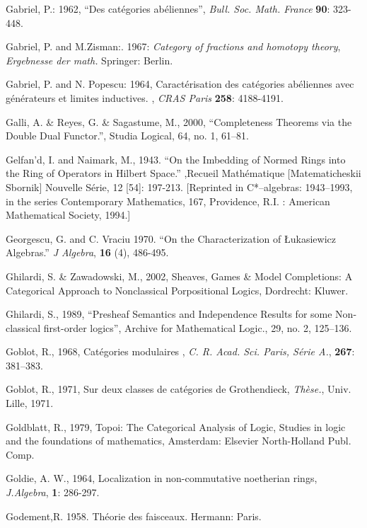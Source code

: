 \documentclass[12pt]{article}
\theoremstyle{plain}
\theoremstyle{definition}
\numberwithin{equation}{section}
\begin{document}
\begin{thebibliography}{99}
Gabriel, P.: 1962, ``Des cat\'egories ab\'eliennes'', \emph{Bull. Soc.
Math. France} \textbf{90}: 323-448.

Gabriel, P. and M.Zisman:. 1967: \emph{Category of fractions and homotopy theory}, \emph{Ergebnesse der math.} Springer: Berlin.

Gabriel, P. and N. Popescu: 1964, Caract\'{e}risation des cat\'egories ab\'eliennes
avec g\'{e}n\'{e}rateurs et limites inductives. , \emph{CRAS Paris} \textbf{258}: 4188-4191.

Galli, A. \& Reyes, G. \& Sagastume, M., 2000, ``Completeness Theorems via the Double Dual Functor.'', Studia Logical, 64, no. 1, 61--81. 

Gelfan'd, I. and Naimark, M., 1943. ``On the Imbedding of Normed Rings into the 
Ring of Operators in Hilbert Space.'' ,Recueil Math\'ematique [Matematicheskii 
Sbornik] Nouvelle S\'erie, 12 [54]: 197-213. [Reprinted in C*--algebras: 
1943--1993, in the series Contemporary Mathematics, 167,  Providence, R.I. : 
American Mathematical Society, 1994.] 

Georgescu, G. and C. Vraciu 1970. ``On the Characterization of \L{}ukasiewicz 
Algebras.'' \emph{J Algebra}, \textbf{16} (4), 486-495.

Ghilardi, S. \& Zawadowski, M., 2002, Sheaves, Games \& Model Completions: A Categorical Approach to Nonclassical Porpositional Logics, Dordrecht: Kluwer.  

Ghilardi, S., 1989, ``Presheaf Semantics and Independence Results for some Non-classical first-order logics'', Archive for Mathematical Logic., 29, no. 2, 125--136. 

Goblot, R., 1968, Cat\'egories modulaires , {\em C. R. Acad. Sci. Paris, S\'erie A.}, \textbf{267}: 381--383.

Goblot, R., 1971, Sur deux classes de cat\'egories de Grothendieck, {\em Th\`ese.}, Univ. Lille, 1971.

Goldblatt, R., 1979, Topoi: The Categorical Analysis of Logic, Studies in logic and the foundations of mathematics, Amsterdam: Elsevier North-Holland Publ. Comp. 

Goldie, A. W., 1964, Localization in non-commutative noetherian rings, {\em J.Algebra}, \textbf{1}: 286-297.

Godement,R. 1958. Th\'{e}orie des faisceaux. Hermann: Paris.


\end{thebibliography}
\end{document}
